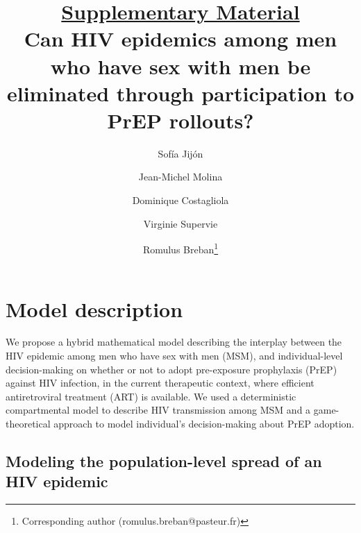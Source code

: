 \documentclass[11pt]{article}
\begin{document}
\title{\underline{Supplementary Material}\\ \bigskip
\LARGE
Can HIV epidemics among men who have sex with men be eliminated through participation to PrEP rollouts? 
}

\author[1]{Sof\'ia Jij\'on}%
\author[2]{Jean-Michel Molina}%
\author[1]{Dominique Costagliola}%
\author[1]{Virginie Supervie}%
\author[,3]{Romulus Breban\thanks{Corresponding author (romulus.breban@pasteur.fr)}}



\date{}

\maketitle

\newpage
\tableofcontents

\newpage
\listoftables
\listoffigures

\newpage
\section{Model description}

We propose a hybrid mathematical model describing the interplay between the HIV epidemic among men who have sex with men (MSM), and individual-level decision-making on whether or not to adopt pre-exposure prophylaxis (PrEP) against HIV infection, in the current therapeutic context, where efficient antiretroviral treatment (ART) is available. We used a deterministic compartmental model to describe HIV transmission among MSM and a game-theoretical approach to model individual's decision-making about PrEP adoption.


\subsection{Modeling the population-level spread of an HIV epidemic}
\end{document}
